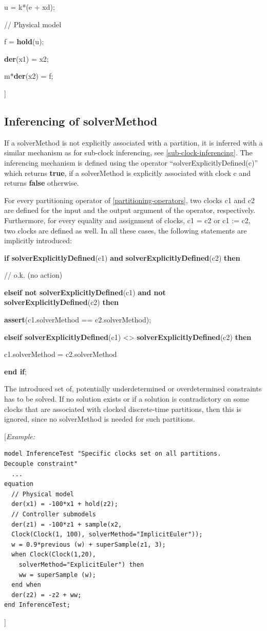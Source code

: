 \documentclass[10pt,a4paper]{report}
\def\doublelabel#1{\label{#1}\hypertarget{#1}{}}
\begin{document}
u = k*(e + xd);

// Physical model

f = \textbf{hold}(u);

\textbf{der}(x1) = x2;

m*\textbf{der}(x2) = f;

{]}

\subsection{Inferencing of solverMethod}\doublelabel{inferencing-of-solvermethod}

If a solverMethod is not explicitly associated with a partition, it is
inferred with a similar mechanism as for sub-clock inferencing, see
\ref{sub-clock-inferencing}. The inferencing mechanism is defined using the operator
``solverExplicitlyDefined(c)'' which returns \textbf{true}, if a
solverMethod is explicitly associated with clock c and returns
\textbf{false} otherwise.

For every partitioning operator of \ref{partitioning-operators}, two clocks c1 and c2
are defined for the input and the output argument of the operator,
respectively. Furthermore, for every equality and assignment of clocks,
c1 = c2 or c1 := c2, two clocks are defined as well. In all these cases,
the following statements are implicitly introduced:

\textbf{if solverExplicitlyDefined}(c1) \textbf{and}
\textbf{solverExplicitlyDefined}(c2) \textbf{then}

// o.k. (no action)

\textbf{elseif not solverExplicitlyDefined}(c1) \textbf{and not
solverExplicitlyDefined}(c2) \textbf{then}

\textbf{assert}(c1.solverMethod == c2.solverMethod);

\textbf{elseif solverExplicitlyDefined}(c1) \textless{}\textgreater{}
\textbf{solverExplicitlyDefined}(c2) \textbf{then}

c1.solverMethod = c2.solverMethod

\textbf{end if};

The introduced set of, potentially underdetermined or overdetermined
constraints has to be solved. If no solution exists or if a solution is
contradictory on some clocks that are associated with clocked
discrete-time partitions, then this is ignored, since no solverMethod is
needed for such partitions.

{[}\emph{Example:}

\begin{lstlisting}[language=modelica]
model InferenceTest "Specific clocks set on all partitions.
Decouple constraint"
  ...
equation 
  // Physical model
  der(x1) = -100*x1 + hold(z2);
  // Controller submodels
  der(z1) = -100*z1 + sample(x2,
  Clock(Clock(1, 100), solverMethod="ImplicitEuler"));
  w = 0.9*previous (w) + superSample(z1, 3);
  when Clock(Clock(1,20),
    solverMethod="ExplicitEuler") then 
    ww = superSample (w);
  end when
  der(z2) = -z2 + ww;
end InferenceTest;
\end{lstlisting}
{]}
\end{document}
